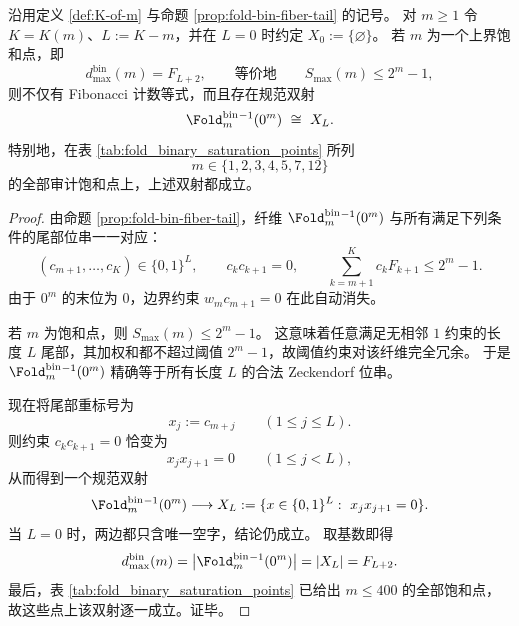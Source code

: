 \begin{theorem}[上界饱和点的最大纤维与低阶稳定类型空间的规范同构]\label{thm:window6-saturation-maxfiber-canonical-xL}
沿用定义 \ref{def:K-of-m} 与命题 \ref{prop:fold-bin-fiber-tail} 的记号。
对 \(m\ge 1\) 令 \(K=K(m)\)、\(L:=K-m\)，并在 \(L=0\) 时约定 \(X_0:=\{\varnothing\}\)。
若 \(m\) 为一个上界饱和点，即
\[
d_{\max}^{\mathrm{bin}}(m)=F_{L+2},
\qquad\text{等价地}\qquad
S_{\max}(m)\le 2^m-1,
\]
则不仅有 Fibonacci 计数等式，而且存在规范双射
\[
\Fold_m^{\mathrm{bin}}{}^{-1}(0^m)\ \cong\ X_L.
\]
特别地，在表 \ref{tab:fold_binary_saturation_points} 所列
\[
m\in\{1,2,3,4,5,7,12\}
\]
的全部审计饱和点上，上述双射都成立。
\end{theorem}
\begin{proof}
由命题 \ref{prop:fold-bin-fiber-tail}，纤维
\(
\Fold_m^{\mathrm{bin}}{}^{-1}(0^m)
\)
与所有满足下列条件的尾部位串一一对应：
\[
(c_{m+1},\dots,c_K)\in\{0,1\}^{L},
\qquad
c_kc_{k+1}=0,
\qquad
\sum_{k=m+1}^{K}c_kF_{k+1}\le 2^m-1.
\]
由于 \(0^m\) 的末位为 \(0\)，边界约束 \(w_mc_{m+1}=0\) 在此自动消失。

若 \(m\) 为饱和点，则
\(
S_{\max}(m)\le 2^m-1
\)。
这意味着任意满足无相邻 \(1\) 约束的长度 \(L\) 尾部，其加权和都不超过阈值 \(2^m-1\)，故阈值约束对该纤维完全冗余。
于是 \(\Fold_m^{\mathrm{bin}}{}^{-1}(0^m)\) 精确等于所有长度 \(L\) 的合法 Zeckendorf 位串。

现在将尾部重标号为
\[
x_j:=c_{m+j}\qquad(1\le j\le L).
\]
则约束 \(c_kc_{k+1}=0\) 恰变为
\[
x_jx_{j+1}=0\qquad(1\le j<L),
\]
从而得到一个规范双射
\[
\Fold_m^{\mathrm{bin}}{}^{-1}(0^m)
\longrightarrow
X_L
:=
\{x\in\{0,1\}^L:\ x_jx_{j+1}=0\}.
\]
当 \(L=0\) 时，两边都只含唯一空字，结论仍成立。
取基数即得
\[
d_{\max}^{\mathrm{bin}}(m)
=
\bigl|\Fold_m^{\mathrm{bin}}{}^{-1}(0^m)\bigr|
=
|X_L|
=
F_{L+2}.
\]
最后，表 \ref{tab:fold_binary_saturation_points} 已给出 \(m\le 400\) 的全部饱和点，故这些点上该双射逐一成立。证毕。
\end{proof}
